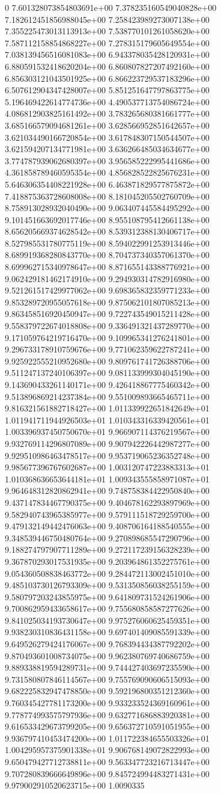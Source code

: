 0	7.601328073854803691e+00	7.378235160549040828e+00	7.182612451856988045e+00	7.258423989273007138e+00	7.355225473013113913e+00	7.538770101261058620e+00	7.587112158854868227e+00	7.278315179605649554e+00	7.038139456516081083e+00	6.943378035428120931e+00	6.880591532418620204e+00	6.860807827207492160e+00	6.856303121043501925e+00	6.866223729537183296e+00	6.507612904347428007e+00	5.851251647797863775e+00	5.196469422614774736e+00	4.490537713754086724e+00	4.086812903825161492e+00	3.783265680381661777e+00	3.685166579094681261e+00	3.628566952851642657e+00	3.621034490166720854e+00	3.617848307150544507e+00	3.621594207134771981e+00	3.636266485034634677e+00	3.774787939062680397e+00	3.956585222995441686e+00	4.361858789460595354e+00	4.856828522825676231e+00	5.646306354408221928e+00	6.463871829577875872e+00	7.418875363728608008e+00	8.181045205502760709e+00	8.758913028932040490e+00	9.063407445584495292e+00	9.101451663692017746e+00	8.955108795412661138e+00	8.656205669374628542e+00	8.539312388130406717e+00	8.527985531780775119e+00	8.594022991253913446e+00	8.689919368280843770e+00	8.704737340357061370e+00	8.699962715340978647e+00	8.871655143388776921e+00	9.062429181462174910e+00	9.294930314782916980e+00	9.521261517429977062e+00	9.698365832359771233e+00	9.853289720955057618e+00	9.875062101807085213e+00	9.863458516920450947e+00	9.722743549015211428e+00	9.558379722674018808e+00	9.336491321437289770e+00	9.171059764219716470e+00	9.109965341276241801e+00	9.296733178910759676e+00	9.771062359622787241e+00	9.925922555210952680e+00	9.809761741726388706e+00	9.511247137240106397e+00	9.081133999304045190e+00	9.143690433261140171e+00	9.426418867775460342e+00	9.513896869214237384e+00	9.551009893665465711e+00	9.816321561882718427e+00	1.011339922651842649e+01	1.011941711944926503e+01	1.010343316339420561e+01	1.003396937450750670e+01	9.966907114376219567e+00	9.932769114296807089e+00	9.907942226442987277e+00	9.929510986463478517e+00	9.953719065236352748e+00	9.985677396767602687e+00	1.003120747223883313e+01	1.010368636653644181e+01	1.009343555858971087e+01	9.964648312820862941e+00	9.748758384422950840e+00	9.437147834467790375e+00	9.404678162293897969e+00	9.582940743965385977e+00	9.579111518729259700e+00	9.479132149442476063e+00	9.408706164188540555e+00	9.348539446750480764e+00	9.270898685547290796e+00	9.188274797907711289e+00	9.272117239156328239e+00	9.367870293017531935e+00	9.203964861352275761e+00	9.054360508838463772e+00	9.284472113002451010e+00	9.485103730126793309e+00	9.531350856038255159e+00	9.580797203243855975e+00	9.641809731524261906e+00	9.700862959433658617e+00	9.755680858587277626e+00	9.841025034193730647e+00	9.975276060625459351e+00	9.938230310836431158e+00	9.697401409085591339e+00	9.649526279424176067e+00	9.768394434387792202e+00	9.870493601008734075e+00	9.962380769740686759e+00	9.889338819594289731e+00	9.744427403697235590e+00	9.731580807846114567e+00	9.755769090606515093e+00	9.682225832947478850e+00	9.592196800351212360e+00	9.760345427781173200e+00	9.933233524369160961e+00	9.778774993575797936e+00	9.632771686883920381e+00	9.616533429673799205e+00	9.656372710591051955e+00	9.936797410453474200e+00	1.011722384655503326e+01	1.004295957375901338e+01	9.906768149072822993e+00	9.650479427712738811e+00	9.563347723216713447e+00	9.707280839666649896e+00	9.845724994483271431e+00	9.979002910520623715e+00	1.0090335
